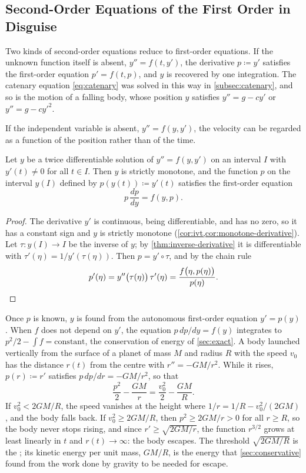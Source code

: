 \subsection{Second-Order Equations of the First Order in Disguise}

Two kinds of second-order equations reduce to first-order equations. If the unknown function itself is absent, $y''=f(t,y')$, the derivative $p\coloneqq y'$ satisfies the first-order equation $p'=f(t,p)$, and $y$ is recovered by one integration. The catenary equation \eqref{eq:catenary} was solved in this way in \cref{subsec:catenary}, and so is the motion of a falling body, whose position $y$ satisfies $y''=g-cy'$ or $y''=g-cy'^2$.

If the independent variable is absent, $y''=f(y,y')$, the velocity can be regarded as a function of the position rather than of the time.

\begin{proposition}
\label{prop:reduction-autonomous}
Let $y$ be a twice differentiable solution of $y''=f(y,y')$ on an interval $I$ with $y'(t)\ne0$ for all $t\in I$. Then $y$ is strictly monotone, and the function $p$ on the interval $y(I)$ defined by $p(y(t))\coloneqq y'(t)$ satisfies the first-order equation
\[
p\,\frac{dp}{dy}=f(y,p) .
\]
\end{proposition}

\begin{proof}
The derivative $y'$ is continuous, being differentiable, and has no zero, so it has a constant sign and $y$ is strictly monotone (\cref{cor:ivt,cor:monotone-derivative}). Let $\tau\colon y(I)\to I$ be the inverse of $y$; by \cref{thm:inverse-derivative} it is differentiable with $\tau'(\eta)=1/y'(\tau(\eta))$. Then $p=y'\circ\tau$, and by the chain rule
\[
p'(\eta)=y''\bigl(\tau(\eta)\bigr)\,\tau'(\eta)=\frac{f\bigl(\eta,p(\eta)\bigr)}{p(\eta)} .\qedhere
\]
\end{proof}

Once $p$ is known, $y$ is found from the autonomous first-order equation $y'=p(y)$. When $f$ does not depend on $y'$, the equation $p\,dp/dy=f(y)$ integrates to $p^2/2-\int f=\text{constant}$, the conservation of energy of \cref{sec:exact}. A body launched vertically from the surface of a planet of mass $M$ and radius $R$ with the speed $v_0$ has the distance $r(t)$ from the centre with $r''=-GM/r^2$. While it rises, $p(r)\coloneqq r'$ satisfies $p\,dp/dr=-GM/r^2$, so that
\[
\frac{p^2}2-\frac{GM}r=\frac{v_0^2}2-\frac{GM}R .
\]
If $v_0^2<2GM/R$, the speed vanishes at the height where $1/r=1/R-v_0^2/(2GM)$, and the body falls back. If $v_0^2\ge2GM/R$, then $p^2\ge2GM/r>0$ for all $r\ge R$, so the body never stops rising, and since $r'\ge\sqrt{2GM/r}$, the function $r^{3/2}$ grows at least linearly in $t$ and $r(t)\to\infty$: the body escapes. The threshold $\sqrt{2GM/R}$ is the ; its kinetic energy per unit mass, $GM/R$, is the energy that \cref{sec:conservative} found from the work done by gravity to be needed for escape.

